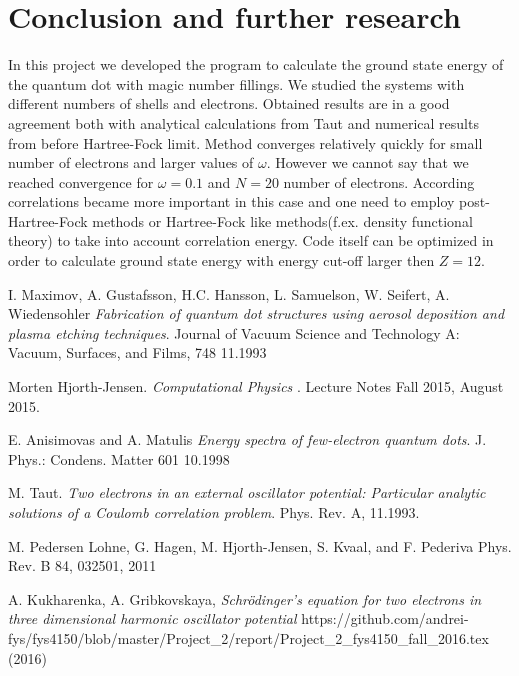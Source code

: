 \documentclass[10pt]{article}
\begin{document}
\section{Conclusion and further research}\label{conc}
In this project we developed the program to calculate the ground state energy of the quantum dot with magic number fillings. We studied the systems with different numbers of shells and electrons. Obtained results are in a good agreement both with analytical calculations from Taut \cite{Taut} and numerical results from \cite{Hjorth-Jensen} before Hartree-Fock limit.
Method converges relatively quickly for small number of electrons and larger values of $\omega$. However we cannot say that we reached convergence for $\omega=0.1$ and $N=20$ number of electrons. According \cite{Hjorth-Jensen} correlations became more important in this case and one need to employ post-Hartree-Fock methods or Hartree-Fock like methods(f.ex. density functional theory) to take into account correlation energy.
Code itself can be optimized in order to calculate ground state energy with energy cut-off larger then $Z=12$.

\begin{thebibliography}{2}

I. Maximov, A. Gustafsson, H.C. Hansson, L. Samuelson, W. Seifert, A. Wiedensohler
\textit{Fabrication of quantum dot structures using aerosol deposition and plasma etching techniques}.
Journal of Vacuum Science and Technology A: Vacuum, Surfaces, and Films, 748 11.1993

Morten Hjorth-Jensen. 
\textit{Computational Physics
}. 
Lecture Notes Fall 2015, August 2015.


E. Anisimovas and A. Matulis
\textit{Energy spectra of few-electron quantum dots}. 
J. Phys.: Condens. Matter 601 10.1998

M. Taut.
\textit{Two electrons in an external oscillator potential: Particular analytic solutions of a Coulomb correlation problem}.
Phys. Rev. A, 11.1993.

M. Pedersen Lohne, G. Hagen, M. Hjorth-Jensen, S. Kvaal, and F. Pederiva 
\textit{}
Phys. Rev. B 84, 032501, 2011


A. Kukharenka, A. Gribkovskaya,
\textit
{Schr\"{o}dinger's equation for two electrons in three dimensional harmonic oscillator potential
}
https://github.com/andrei-fys/fys4150/blob/master/Project\_2/report/Project\_2\_fys4150\_fall\_2016.tex (2016)

\end{thebibliography}
\end{document}
